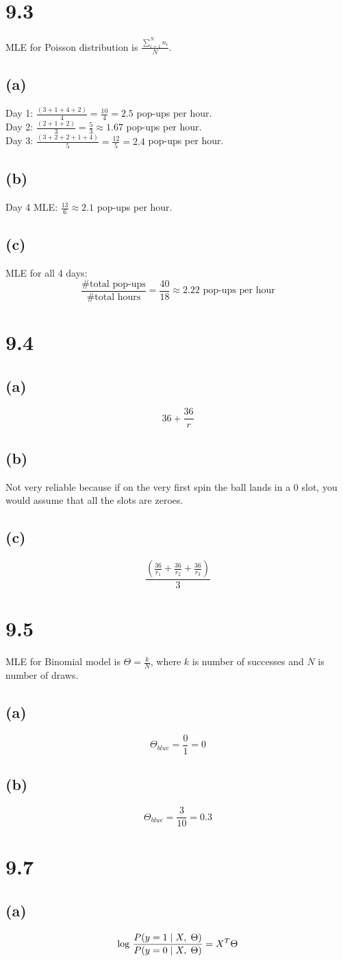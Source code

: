 \documentclass[11pt]{article}
\newcommand{\given}{\hspace{1mm}|\hspace{1mm}}
\newcommand{\hsp}{\hspace{1mm}}
\begin{document}
\section*{9.3}
MLE for Poisson distribution is $\frac{\sum_{i=1}^N{n_i}}{N}$.
\clearpage
\subsection*{(a)}
Day 1: $\frac{(3+1+4+2)}{4}=\frac{10}{4}=2.5$ pop-ups per hour. \\
Day 2: $\frac{(2+1+2)}{3}=\frac{5}{3}\approx 1.67$ pop-ups per hour. \\
Day 3: $\frac{(3+2+2+1+4)}{5}=\frac{12}{5}=2.4$ pop-ups per hour.
\subsection*{(b)}
Day 4 MLE: $\frac{13}{6}\approx2.1$ pop-ups per hour.
\subsection*{(c)}
MLE for all 4 days:
\[\frac{\text{\# total pop-ups}}{\text{\# total hours}}=\frac{40}{18}\approx2.22\text{ pop-ups per hour}\]
\section*{9.4}
\subsection*{(a)}
\[36+\frac{36}{r}\]
\subsection*{(b)}
Not very reliable because if on the very first spin the ball lands in a 0 slot, you would assume that all the slots are zeroes.
\subsection*{(c)}
\[\frac{\left(\frac{36}{r_1}+\frac{36}{r_2}+\frac{36}{r_3}\right)}{3}\]
\section*{9.5}
MLE for Binomial model is $\Theta=\frac{k}{N}$, where $k$ is number of successes and $N$ is number of draws.
\subsection*{(a)}
\[\Theta_{blue}=\frac{0}{1}=0\]
\subsection*{(b)}
\[\Theta_{blue}=\frac{3}{10}=0.3\]
\section*{9.7}
\subsection*{(a)}
\[\text{log }\frac{P(y=1\given X,\hsp\Theta)}{P(y=0\given X,\hsp\Theta)}=X^T\Theta\]
\end{document}

